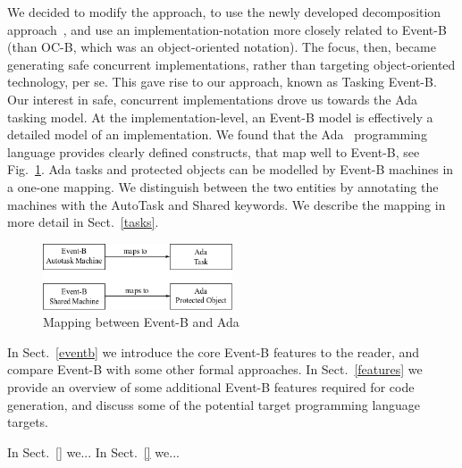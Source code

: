 We decided to modify the approach, to use the newly developed decomposition approach~\cite{decomp2010c,decomp2010b}, and use an implementation-notation more closely related to Event-B (than OC-B, which was an object-oriented notation). The focus, then, became generating safe concurrent implementations, rather than targeting object-oriented technology, per se. This gave rise to our approach, known as Tasking Event-B. Our interest in safe, concurrent implementations drove us towards the Ada tasking model. At the implementation-level, an Event-B model is effectively a detailed model of an implementation. We found that the Ada~\cite{ada2005} programming language provides clearly defined constructs, that map well to Event-B, see Fig.~\ref{fig:B_Ada}. Ada tasks and protected objects can be modelled by Event-B machines in a one-one mapping. We distinguish between the two entities by annotating the machines with the AutoTask and Shared keywords. We describe the mapping in more detail in Sect.~\ref{tasks}.
%
\begin{figure}
\centering
\includegraphics[width=0.5\textwidth]{graphics/B_Ada.png}
\caption{Mapping between Event-B and Ada}
\label{fig:B_Ada}
\end{figure}
%

In Sect.~\ref{eventb} we introduce the core Event-B features to the reader, and compare Event-B with some other formal approaches.  In Sect.~\ref{features} we provide an overview of some additional Event-B features required for code generation, and discuss some of the potential target programming language targets.

In Sect.~\ref{} we...
In Sect.~\ref{} we...

